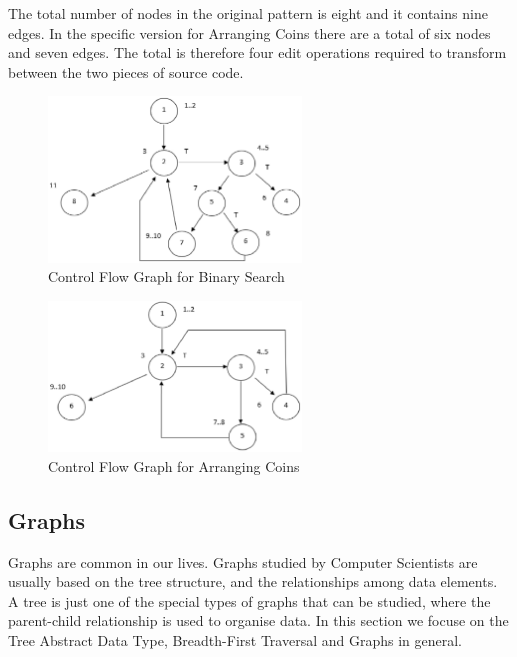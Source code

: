 \documentclass[conference]{IEEEtran}
\begin{document}
\par The total number of nodes in the original pattern is eight and it contains nine edges. In the specific version for Arranging Coins there are a total of six nodes and seven edges. The total is therefore four edit operations required to transform between the two pieces of source code.
 \begin{figure}[H]
\includegraphics[width=0.6\textwidth]{CFGBinarySearch}
\caption{Control Flow Graph for Binary Search}
\label{fig:cfgbinarysearch}
\end{figure}
 \begin{figure}[H]
\includegraphics[width=0.6\textwidth]{CFGArrangingCoins}
\caption{Control Flow Graph for Arranging Coins}
\label{fig:cfgbinarysearch}
\end{figure}

	
	\subsection{Graphs}
	Graphs are common in our lives. Graphs studied by Computer Scientists are usually based on the tree structure, and the relationships among data elements. A tree is just one of the special types of graphs that can be studied, where the parent-child relationship is used to organise data. In this section we focuse on the Tree Abstract Data Type, Breadth-First Traversal and Graphs in general. \\
\end{document}
